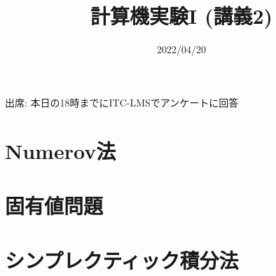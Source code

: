 \documentclass[10pt,dvipdfmx]{beamer}
\title{計算機実験I (講義2)}
\date{2022/04/20}
\begin{document}
\begin{frame}
  \titlepage
  \tableofcontents
  出席: 本日の18時までにITC-LMSでアンケートに回答
\end{frame}



\section{Numerov法}





\section{固有値問題}




\section{シンプレクティック積分法}













\end{document}
